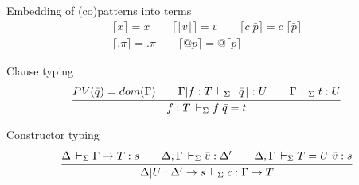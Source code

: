\documentclass[acmlarge,fleqn]{acmart}\settopmatter{}
\begin{document}
Embedding of (co)patterns into terms 
\begin{gather*}
\lceil x \rceil = x \qquad
\lceil \lfloor v \rfloor \rceil = v \qquad
\lceil c\; \bar{p} \rceil = c\; \lceil \bar{p} \rceil \\
\lceil .\pi \rceil = .\pi \qquad
\lceil @p \rceil = @ \lceil p \rceil
\end{gather*}


%
%

Clause typing 
\begin{gather*}
\ru{PV(\bar{q}) = dom(\Gamma) \qquad
    \Gamma | f : T \ders \lceil \bar{q} \rceil : U \qquad
    \Gamma \ders t : U}
   {f : T \ders f\; \bar{q} = t}
\end{gather*}

Constructor typing 
\begin{gather*}
\ru{\Delta \ders \Gamma \to T : s \qquad
    \Delta,\Gamma \ders \bar{v} : \Delta' \qquad
    \Delta,\Gamma \ders T = U\; \bar{v} : s}
   {\Delta | U : \Delta' \to s \ders c : \Gamma \to T}
\end{gather*}
\end{document}
